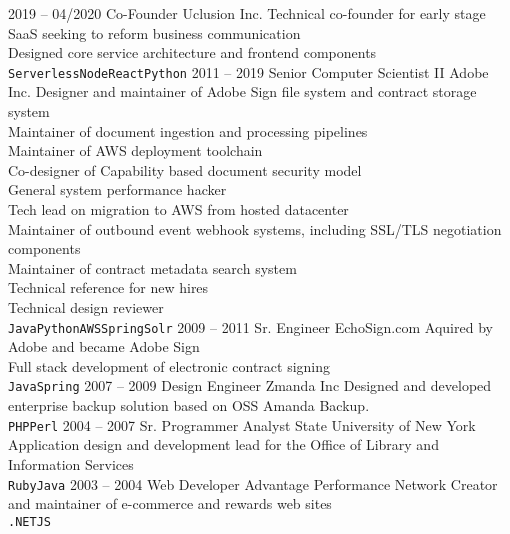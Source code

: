 \documentclass[9pt]{developercv} %
\begin{document}
\begin{entrylist}
	\entry
		{2019 -- 04/2020}
		{Co-Founder}
		{Uclusion Inc.}
	        {Technical co-founder for early stage SaaS seeking to reform business communication\\
	        Designed core service architecture and frontend components\\
		\texttt{Serverless}\slashsep\texttt{Node}\slashsep\texttt{React}\slashsep\texttt{Python}}
	\entry
		{2011 -- 2019}
		{Senior Computer Scientist II}
		{Adobe Inc.}
                {Designer and maintainer of Adobe Sign file system and contract storage system\\
                Maintainer of document ingestion and processing pipelines\\
                Maintainer of AWS deployment toolchain\\
                Co-designer of Capability based document security model\\
                General system performance hacker\\
                Tech lead on migration to AWS from hosted datacenter\\
                Maintainer of outbound event webhook systems, including SSL/TLS negotiation components\\
                Maintainer of contract metadata search system\\
                Technical reference for new hires\\
                Technical design reviewer\\
		\texttt{Java}\slashsep\texttt{Python}\slashsep\texttt{AWS}\slashsep\texttt{Spring}\slashsep\texttt{Solr}}
	\entry
		{2009 -- 2011}
		{Sr. Engineer}
		{EchoSign.com}
                {Aquired by Adobe and became Adobe Sign\\
                Full stack development of electronic contract signing \\
		\texttt{Java}\slashsep\texttt{Spring}}
	\entry
		{2007 -- 2009}
		{Design Engineer}
		{Zmanda Inc}
                {Designed and developed enterprise backup solution based on OSS Amanda Backup.\\
		\texttt{PHP}\slashsep\texttt{Perl}}
	\entry
		{2004 -- 2007}
		{Sr. Programmer Analyst}
		{State University of New York}
                {Application design and development lead for the Office of Library and Information Services\\
		\texttt{Ruby}\slashsep\texttt{Java}}
	\entry
		{2003 -- 2004}
		{Web Developer}
		{Advantage Performance Network}
                {Creator and maintainer of e-commerce and rewards web sites\\
		\texttt{.NET}\slashsep\texttt{JS}}
\end{entrylist}
\end{document}
